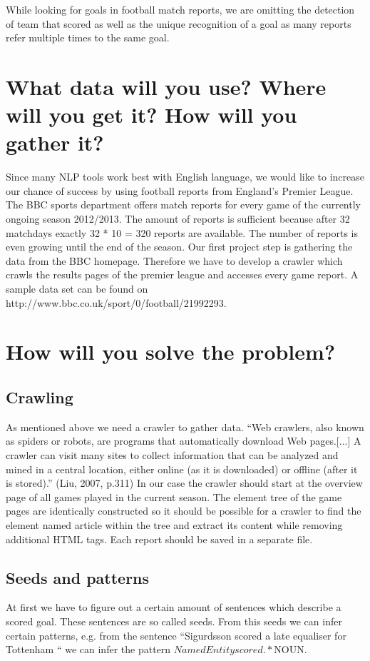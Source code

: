 \documentclass[11pt,titlepage,oneside,openany]{book}
\begin{document}
While looking for goals in football match reports, we are omitting the detection of team that scored as well as the unique recognition of a goal as many reports refer multiple times to the same goal.

\section{What data will you use? Where will you get it? How will you gather it?}

Since many NLP tools work best with English language, we would like to increase our chance of success by using football reports from England’s Premier League. The BBC sports department offers match reports for every game of the currently ongoing season 2012/2013. The amount of reports is sufficient because after 32 matchdays exactly 32 * 10 = 320 reports are available. The number of reports is even growing until the end of the season. Our first project step is gathering the data from the BBC homepage. Therefore we have to develop a crawler which crawls the results pages of the premier league and accesses every game report. A sample data set can be found on http://www.bbc.co.uk/sport/0/football/21992293.		
			
\section{How will you solve the problem?}
\subsection{Crawling}
As mentioned above we need a crawler to gather data. “Web crawlers, also known as spiders or robots, are programs that automatically download Web pages.[...] A crawler can visit many sites to collect information that can be analyzed and mined in a central location, either online (as it is downloaded) or offline (after it is stored).” (Liu, 2007, p.311) In our case the crawler should start at the overview page of all games played in the current season. The element tree of the game pages are identically constructed so it should be possible for a crawler to find the element named article within the tree and extract its content while removing additional HTML tags. Each report should be saved in a separate file. 

\subsection{Seeds and patterns}
At first we have to figure out a certain amount of sentences which describe a scored goal. These sentences are so called seeds. 
From this seeds we can infer certain patterns, e.g. from the sentence “Sigurdsson scored a late equaliser for Tottenham “ we can infer the pattern $NamedEntity scored .* $NOUN. 
\end{document}

